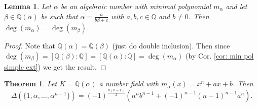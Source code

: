 \documentclass[11pt,a4paper]{report}
\theoremstyle{plain}
\newtheorem{theorem}[subsection]{Theorem}
\newtheorem{lemma}[subsection]{Lemma}
\theoremstyle{definition}
\theoremstyle{definition}
\def\QQ{\mathbb{Q}}
\def \a{\alpha}
\begin{document}
	\begin{lemma}\label{lem: min pol of lin trans}
		Let $\a$ be an algebraic number with minimal polynomial $m_\a$ and let $\beta \in \QQ(\a)$ be such that $\a=\frac{a}{b\beta+c}$ with $a,b,c \in \QQ$ and $b \neq 0$. Then $\deg(m_\a)=\deg(m_\beta)$.
	\end{lemma}
	
	\begin{proof}
		
		
		
		
		
		Note that $\QQ(\a)=\QQ(\beta)$ (just do double inclusion). Then since $\deg(m_\beta)=[\QQ(\beta):\QQ]=[\QQ(\a):\QQ]=\deg(m_\a)$  (by Cor. \ref{cor: min pol simple ext}) we get the result.       
		
	\end{proof}
	
	\begin{theorem}\label{thm: disc of trinom}
		Let $K=\QQ(\a)$ a number field with $m_\a(x)=x^n+ax+b$. Then \[\Delta(\{1,\a,\dots,\a^{n-1}\})=(-1)^{\frac{n(n-1)}{2}}(n^nb^{n-1}+(-1)^{n-1}(n-1)^{n-1}a^n)   .\]
	\end{theorem}
	
\end{document}
